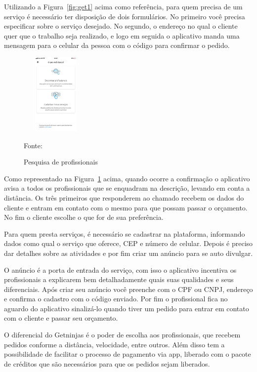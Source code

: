 Utilizando a Figura~\hypersetup{linkcolor=black}\ref{fig:get1} acima como referência, para quem precisa de um serviço é necessário ter disposição de dois formulários. No primeiro você precisa especificar sobre o serviço desejado. No segundo, o endereço no qual o cliente quer que o trabalho seja realizado, e logo em seguida o aplicativo manda uma mensagem para o celular da pessoa com o código para confirmar o pedido.

\begin{figure}[!h]
	\centering
		
	\caption{Pesquisa de profissionais}
	\includegraphics[width=130px, height=150px]{./images/getNinjasMobile3.jpeg}
		\label{fig:get2}
	\par {Fonte: \cite{get-ninjasMobilea}}
\end{figure}
\newpage

Como representado na Figura~\hypersetup{linkcolor=black}\ref{fig:get2} acima, quando ocorre a confirmação o aplicativo avisa a todos os profissionais que se enquadram na descrição, levando em conta a distância. Os três primeiros que responderem ao chamado recebem os dados do cliente e entram em contato com o mesmo para que possam passar o orçamento. No fim o cliente escolhe o que for de sua preferência.

Para quem presta serviços, é necessário se cadastrar na plataforma, informando dados como qual o serviço que oferece, CEP e número de celular. Depois é preciso dar detalhes sobre as atividades e por fim criar um anúncio para se auto divulgar.

O anúncio é a porta de entrada do serviço, com isso o aplicativo incentiva os profissionais a explicarem bem detalhadamente quais suas qualidades e seus diferenciais. Após criar seu anúncio você preenche com o CPF ou CNPJ, endereço e confirma o cadastro com o código enviado. Por fim o profissional fica no aguardo do aplicativo sinalizá-lo quando tiver um pedido para entrar em contato com o cliente e passar seu orçamento.

O diferencial do Getninjas é o poder de escolha aos profissionais, que recebem pedidos conforme a distância, velocidade, entre outros. Além disso tem a possibilidade de facilitar o processo de pagamento via app, liberado com o pacote de créditos que são necessários para que os pedidos sejam liberados.


